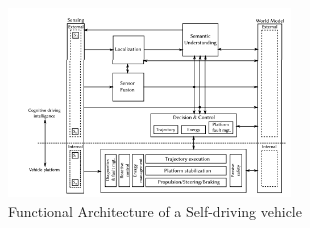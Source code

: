  \begin{figure}[H]
    \centering
    \includegraphics[width=\textwidth,height=5cm,keepaspectratio=true]{src/Images/auv_arch.PNG}
    \caption{
      Functional Architecture of a Self-driving vehicle \cite{behere2015functional}
    }
\end{figure}
\\